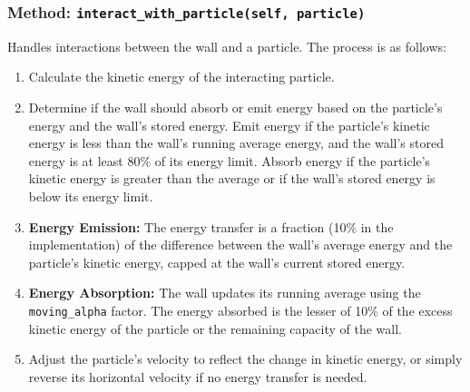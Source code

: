 \documentclass[10pt]{article}
\begin{document}
\subsubsection*{Method: \texttt{interact\_with\_particle(self, particle)}}
Handles interactions between the wall and a particle. The process is as follows:
\begin{enumerate}
    \itemsep-0.2em
    \item Calculate the kinetic energy of the interacting particle.
    \item Determine if the wall should absorb or emit energy based on the particle's energy and the wall's stored energy. Emit energy if the particle's kinetic energy is less than the wall's running average energy, and the wall's stored energy is at least 80\% of its energy limit. Absorb energy if the particle's kinetic energy is greater than the average or if the wall's stored energy is below its energy limit.
    \item \textbf{Energy Emission:} The energy transfer is a fraction (10\% in the implementation) of the difference between the wall's average energy and the particle's kinetic energy, capped at the wall's current stored energy.
    \item \textbf{Energy Absorption:} The wall updates its running average using the \texttt{moving\_alpha} factor. The energy absorbed is the lesser of 10\% of the excess kinetic energy of the particle or the remaining capacity of the wall.
    \item Adjust the particle's velocity to reflect the change in kinetic energy, or simply reverse its horizontal velocity if no energy transfer is needed.
\end{enumerate}
\end{document}
